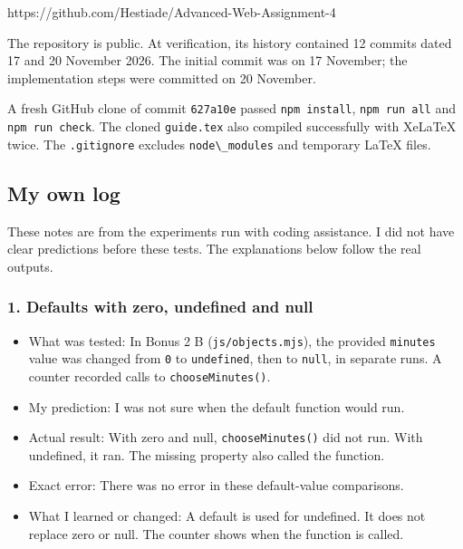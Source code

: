 \documentclass[
  11pt,
]{article}
\newcommand{\passthrough}[1]{#1}
\providecommand{\tightlist}{%
  \setlength{\itemsep}{0pt}\setlength{\parskip}{0pt}}
\begin{document}
https://github.com/Hestiade/Advanced-Web-Assignment-4

The repository is public. At verification, its history contained 12
commits dated 17 and 20 November 2026. The initial commit was on 17
November; the implementation steps were committed on 20 November.

A fresh GitHub clone of commit \passthrough{\lstinline!627a10e!} passed
\passthrough{\lstinline!npm install!},
\passthrough{\lstinline!npm run all!} and
\passthrough{\lstinline!npm run check!}. The cloned
\passthrough{\lstinline!guide.tex!} also compiled successfully with
XeLaTeX twice. The \passthrough{\lstinline!.gitignore!} excludes
\passthrough{\lstinline!node\_modules!} and temporary LaTeX files.

\subsection{My own log}\label{my-own-log}

These notes are from the experiments run with coding assistance. I did
not have clear predictions before these tests. The explanations below
follow the real outputs.

\subsubsection{1. Defaults with zero, undefined and
null}\label{defaults-with-zero-undefined-and-null}

\begin{itemize}
\tightlist
\item
  What was tested: In Bonus 2 B
  (\passthrough{\lstinline!js/objects.mjs!}), the provided
  \passthrough{\lstinline!minutes!} value was changed from
  \passthrough{\lstinline!0!} to \passthrough{\lstinline!undefined!},
  then to \passthrough{\lstinline!null!}, in separate runs. A counter
  recorded calls to \passthrough{\lstinline!chooseMinutes()!}.
\item
  My prediction: I was not sure when the default function would run.
\item
  Actual result: With zero and null,
  \passthrough{\lstinline!chooseMinutes()!} did not run. With undefined,
  it ran. The missing property also called the function.
\item
  Exact error: There was no error in these default-value comparisons.
\item
  What I learned or changed: A default is used for undefined. It does
  not replace zero or null. The counter shows when the function is
  called.
\end{itemize}
\end{document}
